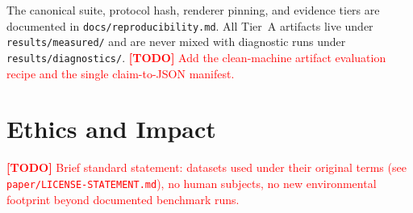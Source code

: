 \documentclass[11pt,letterpaper]{article}
\newcommand{\TODO}[1]{\textcolor{red}{\textbf{[TODO] }#1}}
\begin{document}
The canonical suite, protocol hash, renderer pinning, and evidence tiers are
documented in \texttt{docs/reproducibility.md}. All Tier~A artifacts live
under \texttt{results/measured/} and are never mixed with diagnostic runs
under \texttt{results/diagnostics/}. \TODO{Add the clean-machine artifact
evaluation recipe and the single claim-to-JSON manifest.}

\section{Ethics and Impact}

\TODO{Brief standard statement: datasets used under their original terms (see
\texttt{paper/LICENSE-STATEMENT.md}), no human subjects, no new environmental
footprint beyond documented benchmark runs.}



\end{document}
